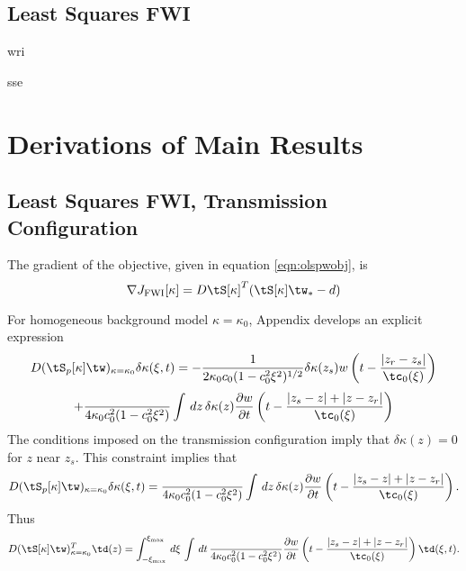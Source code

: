 \subsection{Least Squares FWI}


wri

sse







\section{Derivations of Main Results}






\subsection{Least Squares FWI, Transmission Configuration}

The gradient of the objective, given in equation \ref{eqn:olspwobj},
is
\[
  \nabla J_{\rm FWI}[\kappa] = D\tS[\kappa]^T(\tS[\kappa]\tw_*-d)
\]

For homogeneous background model $\kappa=\kappa_0$, Appendix \appPlane
develops an explicit expression 
\[
D(\tS_p[\kappa]\tw)_{\kappa=\kappa_0}\delta \kappa(\xi,t) =
  -\frac{1}{2\kappa_0c_0(1-c_0^2\xi^2)^{1/2}} \delta 
  \kappa(z_s) w\left(t - \frac{|z_r-z_s|}{\tc_0(\xi)}\right)
\]
\begin{equation}
\label{eqn:dmodhompwpt}
    + \frac{}{4\kappa_0c_0^2(1-c_0^2\xi^2)} \int \,dz\,\delta 
  \kappa(z) \frac{\partial w}{\partial
    t}\left(t - \frac{|z_s-z|+|z-z_r|}{\tc_0(\xi)}\right)
\end{equation}
The conditions imposed on the transmission configuration imply that
$\delta \kappa(z) = 0$ for $z$ near $z_s$. This constraint implies that
\begin{equation}
  \label{eqn:dmodhompwpt0}
  D(\tS_p[\kappa]\tw)_{\kappa=\kappa_0}\delta \kappa(\xi,t) =
     \frac{}{4\kappa_0c_0^2(1-c_0^2\xi^2)} \int \,dz\,\delta 
  \kappa(z)  \frac{\partial w}{\partial
    t}\left(t - \frac{|z_s-z|+|z-z_r|}{\tc_0(\xi)}\right).
\end{equation}
Thus
\begin{equation}
\label{eqn:dmodhomadj}
D(\tS[\kappa]\tw)_{\kappa=\kappa_0}^T\td(z) =
\int_{-\xi_{\rm max}}^{\xi_{\rm max}}\,d\xi\,\int\,dt\,
\frac{}{4\kappa_0c_0^2(1-c_0^2\xi^2)}
\frac{\partial w}{\partial
    t}\left(t - \frac{|z_s-z|+|z-z_r|}{\tc_0(\xi)}\right) \td(\xi,t).
\end{equation}

